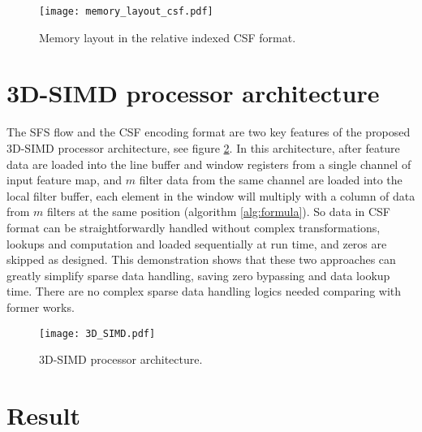 \documentclass{article} %
\begin{document}
\begin{figure}[h]
\begin{center}
\texttt{[image: memory\_layout\_csf.pdf]}
\end{center}
\caption{Memory layout in the relative indexed CSF format.}
\label{memory-layout-csf}
\end{figure}

\section{3D-SIMD processor architecture}
\label{processor}

The SFS flow and the CSF encoding format are two key features of the proposed 3D-SIMD processor architecture, see figure \ref{3D-SIMD}. In this architecture, after feature data are loaded into the line buffer and window registers from a single channel of input feature map, and $m$ filter data from the same channel are loaded into the local filter buffer, each element in the window will multiply with a column of data from $m$ filters at the same position (algorithm \ref{alg:formula}). So data in CSF format can be straightforwardly handled without complex transformations, lookups and computation and loaded sequentially at run time, and zeros are skipped as designed.  This demonstration shows that these two approaches can greatly simplify sparse data handling, saving zero bypassing and data lookup time. There are no complex sparse data handling logics needed comparing with former works\citep{Moons2015DVAS, Moons201714, han2016eie}.

\begin{figure}[h]
\begin{center}
\texttt{[image: 3D\_SIMD.pdf]}
\end{center}
\caption{3D-SIMD processor architecture.}
\label{3D-SIMD}
\end{figure}

\section{Result}
\end{document}

